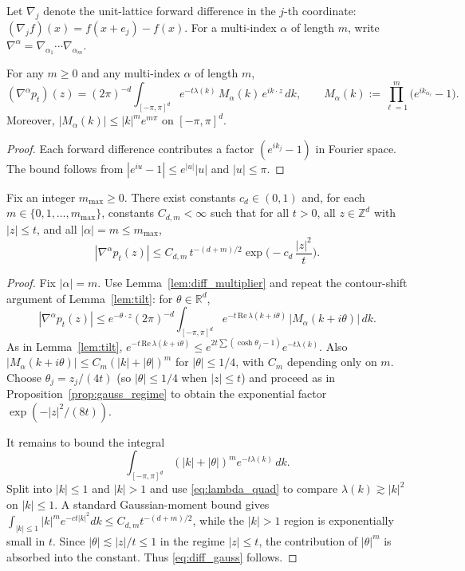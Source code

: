 Let $\nabla_j$ denote the unit-lattice forward difference in the $j$-th coordinate: $(\nabla_j f)(x)=f(x+e_j)-f(x)$.
For a multi-index $\alpha$ of length $m$, write $\nabla^\alpha=\nabla_{\alpha_1}\cdots \nabla_{\alpha_m}$.

\begin{lemma}\label{lem:diff_multiplier}
For any $m\ge 0$ and any multi-index $\alpha$ of length $m$,
\[
(\nabla^\alpha p_t)(z)=(2\pi)^{-d}\int_{[-\pi,\pi]^d} e^{-t\lambda(k)}\,M_\alpha(k)\,e^{ik\cdot z}\,dk,
\qquad
M_\alpha(k):=\prod_{\ell=1}^m\big(e^{ik_{\alpha_\ell}}-1\big).
\]
Moreover, $|M_\alpha(k)|\le |k|^m e^{m\pi}$ on $[-\pi,\pi]^d$.
\end{lemma}

\begin{proof}
Each forward difference contributes a factor $(e^{ik_j}-1)$ in Fourier space.
The bound follows from $|e^{iu}-1|\le e^{|u|}|u|$ and $|u|\le \pi$.
\end{proof}

\begin{proposition}\label{prop:diff_gauss}
Fix an integer $m_{\max}\ge 0$.
There exist constants $c_d\in(0,1)$ and, for each $m\in\{0,1,\dots,m_{\max}\}$, constants $C_{d,m}<\infty$
such that for all $t>0$, all $z\in\mathbb Z^d$ with $|z|\le t$, and all $|\alpha|=m\le m_{\max}$,
\begin{equation}\label{eq:diff_gauss}
|\nabla^\alpha p_t(z)|
\le
C_{d,m}\,t^{-(d+m)/2}\exp\!\Big(-c_d\,\frac{|z|^2}{t}\Big).
\end{equation}
\end{proposition}

\begin{proof}
Fix $|\alpha|=m$. Use Lemma~\ref{lem:diff_multiplier} and repeat the contour-shift argument of Lemma~\ref{lem:tilt}:
for $\theta\in\mathbb R^d$,
\[
|\nabla^\alpha p_t(z)|
\le
e^{-\theta\cdot z}(2\pi)^{-d}\int_{[-\pi,\pi]^d} e^{-t\,\mathrm{Re}\,\lambda(k+i\theta)}\,|M_\alpha(k+i\theta)|\,dk.
\]
As in Lemma~\ref{lem:tilt},
$e^{-t\,\mathrm{Re}\,\lambda(k+i\theta)}\le e^{2t\sum(\cosh\theta_j-1)}e^{-t\lambda(k)}$.
Also $|M_\alpha(k+i\theta)|\le C_m(|k|+|\theta|)^m$ for $|\theta|\le 1/4$,
with $C_m$ depending only on $m$.
Choose $\theta_j=z_j/(4t)$ (so $|\theta|\le 1/4$ when $|z|\le t$) and proceed as in Proposition~\ref{prop:gauss_regime} to obtain the exponential factor
$\exp(-|z|^2/(8t))$.

It remains to bound the integral
\[
\int_{[-\pi,\pi]^d} (|k|+|\theta|)^m e^{-t\lambda(k)}\,dk.
\]
Split into $|k|\le 1$ and $|k|>1$ and use \eqref{eq:lambda_quad} to compare $\lambda(k)\gtrsim |k|^2$ on $|k|\le 1$.
A standard Gaussian-moment bound gives
$\int_{|k|\le 1} |k|^m e^{-c t|k|^2}dk \le C_{d,m} t^{-(d+m)/2}$,
while the $|k|>1$ region is exponentially small in $t$.
Since $|\theta|\lesssim |z|/t\le 1$ in the regime $|z|\le t$, the contribution of $|\theta|^m$ is absorbed into the constant.
Thus \eqref{eq:diff_gauss} follows.
\end{proof}

